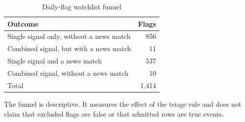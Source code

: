 \begin{table}[htbp]
\centering
\caption{Daily-flag watchlist funnel}
\begin{tabularx}{0.88\textwidth}{@{}Xr@{}}
\toprule
Outcome & Flags \\
\midrule
Single signal only, without a news match & 856 \\
Combined signal, but with a news match & 11 \\
Single signal and a news match & 537 \\
Combined signal, without a news match & 10 \\
\midrule
Total & 1,414 \\
\bottomrule
\end{tabularx}
\end{table}

The funnel is descriptive. It measures the effect of the triage rule and does
not claim that excluded flags are false or that admitted rows are true events.
